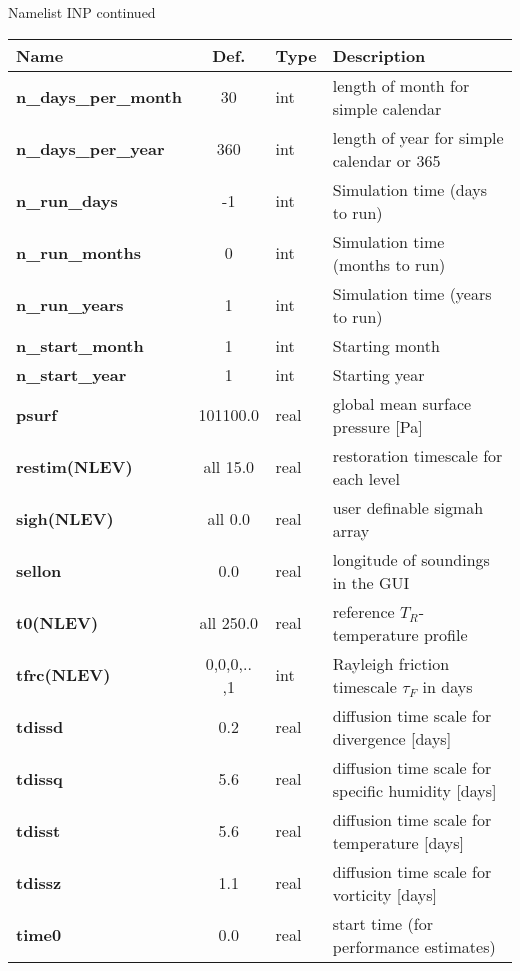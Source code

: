 Namelist INP continued \vspace{3mm} \\
\begin{tabular}{|l|c|l|l|}                                  
\hline                                                        
{\bf Name      }&Def.&Type & Description \\               
\hline                                                        
{\bf n\_days\_per\_month} & 30 & int & length of month for simple calendar \\
{\bf n\_days\_per\_year} & 360 & int & length of year for simple calendar or 365 \\
{\bf n\_run\_days} & -1 & int & Simulation time (days to run) \\
{\bf n\_run\_months} & 0 & int & Simulation time (months to run) \\
{\bf n\_run\_years} & 1 & int & Simulation time (years to run) \\
{\bf n\_start\_month} & 1 & int & Starting month \\
{\bf n\_start\_year} & 1 & int & Starting year \\
{\bf psurf     }&101100.0&real& global mean surface pressure [Pa] \\
{\bf restim(NLEV)}&all 15.0 & real  & restoration timescale for each level \\ 
{\bf sigh(NLEV)} & all 0.0 & real & user definable sigmah array \\
{\bf sellon}    & 0.0 & real & longitude of soundings in the GUI \\
{\bf t0(NLEV)  }&all 250.0&real& reference $T_R$-temperature profile \\ 
{\bf tfrc(NLEV)}& 0,0,0,.. ,1  & int & Rayleigh friction timescale $\tau_F$ in days \\
{\bf tdissd    }& 0.2 & real  & diffusion time scale for divergence [days] \\
{\bf tdissq    }& 5.6 & real  & diffusion time scale for specific humidity [days] \\
{\bf tdisst    }& 5.6 & real  & diffusion time scale for temperature [days] \\
{\bf tdissz    }& 1.1 & real  & diffusion time scale for vorticity [days] \\
{\bf time0  }& 0.0 & real  & start time (for performance estimates) \\
\hline                                                        
\end{tabular}


